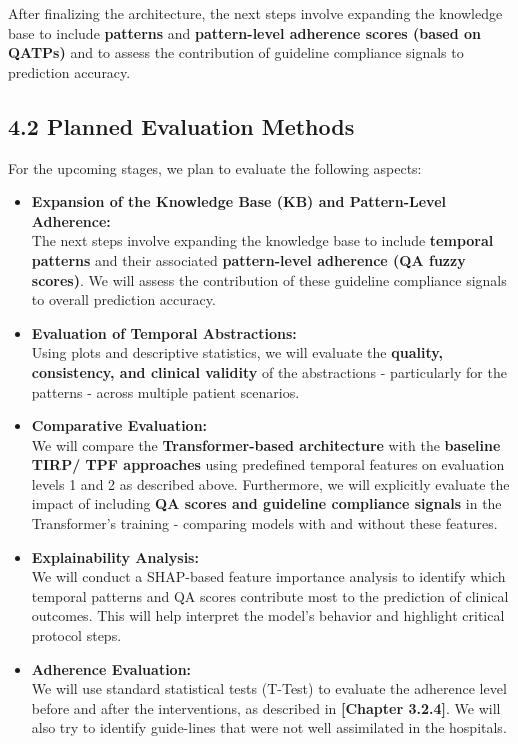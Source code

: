\documentclass[
]{article}
\begin{document}
After finalizing the architecture, the next steps involve expanding the
knowledge base to include \textbf{patterns} and \textbf{pattern-level
adherence scores (based on QATPs)} and to assess the contribution of
guideline compliance signals to prediction accuracy.

\subsection{4.2 Planned Evaluation
Methods}\label{planned-evaluation-methods}

For the upcoming stages, we plan to evaluate the following aspects:

\begin{itemize}
\item
  \textbf{Expansion of the Knowledge Base (KB) and Pattern-Level
  Adherence:\\
  } The next steps involve expanding the knowledge base to include
  \textbf{temporal patterns} and their associated \textbf{pattern-level
  adherence (QA fuzzy scores)}. We will assess the contribution of these
  guideline compliance signals to overall prediction accuracy.
\item
  \textbf{Evaluation of Temporal Abstractions:\\
  } Using plots and descriptive statistics, we will evaluate the
  \textbf{quality, consistency, and clinical validity} of the
  abstractions - particularly for the patterns - across multiple patient
  scenarios.
\item
  \textbf{Comparative Evaluation:\\
  } We will compare the \textbf{Transformer-based architecture} with the
  \textbf{baseline TIRP/ TPF approaches} using predefined temporal
  features on evaluation levels 1 and 2 as described above. Furthermore,
  we will explicitly evaluate the impact of including \textbf{QA scores
  and guideline compliance signals} in the Transformer's training -
  comparing models with and without these features.
\item
  \textbf{Explainability Analysis:\\
  } We will conduct a SHAP-based feature importance analysis to identify
  which temporal patterns and QA scores contribute most to the
  prediction of clinical outcomes. This will help interpret the model's
  behavior and highlight critical protocol steps.
\item
  \textbf{Adherence Evaluation:\\
  } We will use standard statistical tests (T-Test) to evaluate the
  adherence level before and after the interventions, as described in
  \textbf{{[}Chapter 3.2.4{]}}. We will also try to identify guide-lines
  that were not well assimilated in the hospitals.
\end{itemize}
\end{document}
